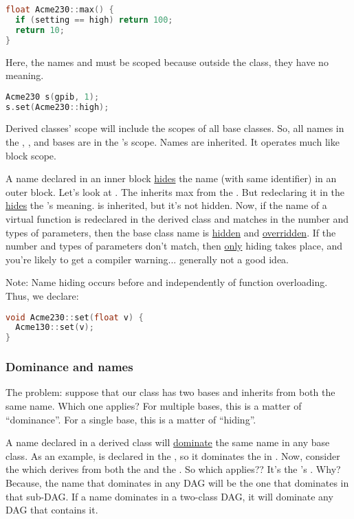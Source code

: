 \begin{lstlisting}[language=C++]
float Acme230::max() {
  if (setting == high) return 100;
  return 10;
}
\end{lstlisting}

Here, the names  and  must be scoped because outside the  class, they have no meaning.

\begin{lstlisting}[language=C++]
Acme230 s(gpib, 1);
s.set(Acme230::high);
\end{lstlisting}

Derived classes' scope will include the scopes of all base classes. So, all names in the , , and  bases are in the 's scope. Names are inherited. It operates much like block scope.

A name declared in an inner block \underline{hides} the name (with same identifier) in an outer block. Let's look at . The  inherits max from the . But redeclaring it in the  \underline{hides} the 's meaning.  is inherited, but it's not hidden. Now, if the name of a virtual function is redeclared in the derived class and matches in the number and types of parameters, then the base class name is \underline{hidden} and \underline{overridden}. If the number and types of parameters don't match, then \underline{only} hiding takes place, and you're likely to get a compiler warning... generally not a good idea.

Note: Name hiding occurs before and independently of function overloading. Thus, we declare:

\begin{lstlisting}[language=C++]
void Acme230::set(float v) {
  Acme130::set(v);
}
\end{lstlisting}

\subsubsection{Dominance and names}

The problem: suppose that our class has two bases and inherits from both the same name. Which one applies? For multiple bases, this is a matter of ``dominance''. For a single base, this is a matter of ``hiding''.

A name declared in a derived class will \underline{dominate} the same name in any base class. As an example,  is declared in the , so it dominates the  in . Now, consider the  which derives from both the  and the . So which  applies?? It's the 's . Why? Because, the name that dominates in any DAG will be the one that dominates in that sub-DAG. If a name dominates in a two-class DAG, it will dominate any DAG that contains it.

